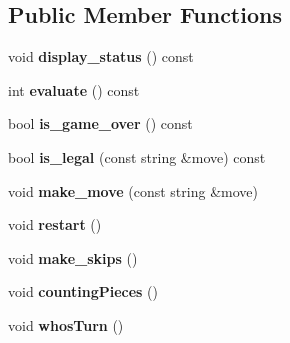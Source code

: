 \subsection*{Public Member Functions}
\begin{DoxyCompactItemize}
\item 
\mbox{\label{classmain__savitch__14_1_1_othello_ab01a4f7aba130133221a11224905e8ce}} 
void {\bfseries display\+\_\+status} () const
\item 
\mbox{\label{classmain__savitch__14_1_1_othello_a57ae44590de8d683592f186ed6bd25b0}} 
int {\bfseries evaluate} () const
\item 
\mbox{\label{classmain__savitch__14_1_1_othello_a540c8b0030e429e0ac30f07e9e8868ec}} 
bool {\bfseries is\+\_\+game\+\_\+over} () const
\item 
\mbox{\label{classmain__savitch__14_1_1_othello_a74ac0d4e6399167037dfc708efdb9033}} 
bool {\bfseries is\+\_\+legal} (const string \&move) const
\item 
\mbox{\label{classmain__savitch__14_1_1_othello_a1066b280efa5cb41039585669282fe06}} 
void {\bfseries make\+\_\+move} (const string \&move)
\item 
\mbox{\label{classmain__savitch__14_1_1_othello_abf872b8074bfa4c04119317dc3b39af2}} 
void {\bfseries restart} ()
\item 
\mbox{\label{classmain__savitch__14_1_1_othello_a3177234195a490eef52343d957e64b5d}} 
void {\bfseries make\+\_\+skips} ()
\item 
\mbox{\label{classmain__savitch__14_1_1_othello_a19f49edfbe82b84922877e00bc854ed8}} 
void {\bfseries counting\+Pieces} ()
\item 
\mbox{\label{classmain__savitch__14_1_1_othello_a21440dbb4511812a76c578a5f546710b}} 
void {\bfseries whos\+Turn} ()
\item 

\end{DoxyCompactItemize}
